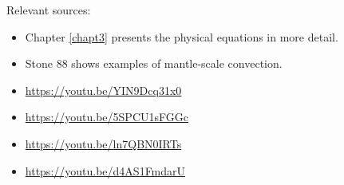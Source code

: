 \vspace{2cm}

Relevant sources:
\begin{itemize}
\item Chapter \ref{chapt3} presents the physical equations in more detail. 
\item Stone 88 shows examples of mantle-scale convection.
\item \url{https://youtu.be/YIN9Dcq31x0}
\item \url{https://youtu.be/5SPCU1sFGGc}
\item \url{https://youtu.be/ln7QBN0IRTs}
\item \url{https://youtu.be/d4AS1FmdarU}
\end{itemize} 


